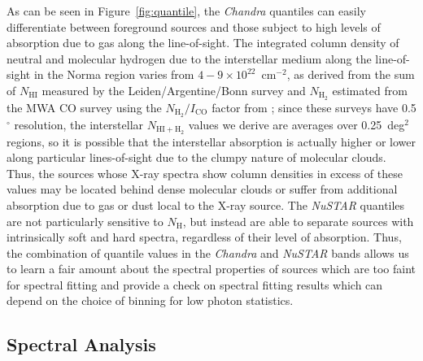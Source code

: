 \documentclass[iop,revtex4]{emulateapj}
\begin{document}
As can be seen in Figure~\ref{fig:quantile}, the \textit{Chandra} quantiles can easily differentiate between foreground sources and those subject to high levels of absorption due to gas along the line-of-sight.  The integrated column density of neutral and molecular hydrogen due to the interstellar medium along the line-of-sight in the Norma region varies from $4-9 \times 10^{22}$~cm$^{-2}$, as derived from the sum of $N_{\mathrm{HI}}$ measured by the Leiden/Argentine/Bonn survey \citep{kalberla05} and $N_{\mathrm{H_2}}$ estimated from the MWA CO survey \citep{bronfman89} using the $N_{\mathrm{H_2}}/I_{\mathrm{CO}}$ factor from \citet{dame01}; since these surveys have 0.5$^{\circ}$ resolution, the interstellar $N_{\mathrm{HI+H_2}}$ values we derive are averages over 0.25~deg$^2$ regions, so it is possible that the interstellar absorption is actually higher or lower along particular lines-of-sight due to the clumpy nature of molecular clouds.  Thus, the sources whose X-ray spectra show column densities in excess of these values may be located behind dense molecular clouds or suffer from additional absorption due to gas or dust local to the X-ray source.  The \textit{NuSTAR} quantiles are not particularly sensitive to $N_{\mathrm{H}}$, but instead are able to separate sources with intrinsically soft and hard spectra, regardless of their level of absorption.  Thus, the combination of quantile values in the \textit{Chandra} and \textit{NuSTAR} bands allows us to learn a fair amount about the spectral properties of sources which are too faint for spectral fitting and provide a check on spectral fitting results which can depend on the choice of binning for low photon statistics.  

\subsection{Spectral Analysis}
\label{sec:spectral}
\end{document}
